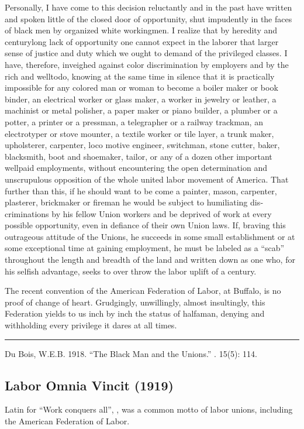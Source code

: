 \documentclass[letterpaper,10pt,english]{jupyterBook}
\begin{document}
\sphinxAtStartPar
Personally, I have come to this decision reluctantly and in the past have written and spoken little of the closed door of opportunity, shut impudently in the faces of black men by organized white workingmen. I realize that by heredity and century\sphinxhyphen{}long lack of opportunity one cannot expect in the laborer that larger sense of justice and duty which we ought to demand of the privileged classes. I have, therefore, inveighed against color discrimination by employers and by the rich and well\sphinxhyphen{}to\sphinxhyphen{}do, knowing at the same time in silence that it is practically impossible for any colored man or woman to become a boiler maker or book binder, an electrical worker or glass maker, a worker in jewelry or leather, a machinist or metal polisher, a paper maker or piano builder, a plumber or a potter, a printer or a pressman, a telegrapher or a railway trackman, an electrotyper or stove mounter, a textile worker or tile layer, a trunk maker, upholsterer, carpenter, loco­ motive engineer, switchman, stone cutter, baker, blacksmith, boot and shoemaker, tailor, or any of a dozen other important well\sphinxhyphen{}paid employments, without encountering the open determination and unscrupulous opposition of the whole united labor movement of America. That further than this, if he should want to be­ come a painter, mason, carpenter, plasterer, brickmaker or fireman he would be subject to humiliating dis­criminations by his fellow Union workers and be deprived of work at every possible opportunity, even in defiance of their own Union laws. If, braving this outrageous attitude of the Unions, he succeeds in some small establishment or at some exceptional time at gaining employment, he must be labeled as a “scab” throughout the length and breadth of the land and written down as one who, for his selfish advantage, seeks to over­ throw the labor uplift of a century.

\sphinxAtStartPar
The recent convention of the American Federation of Labor, at Buffalo, is no proof of change of heart. Grudgingly, unwillingly, almost insultingly, this Federation yields to us inch by inch the status of half\sphinxhyphen{}a\sphinxhyphen{}man, denying and withholding every privilege it dares at all times.


\bigskip\hrule\bigskip


\sphinxAtStartPar
{} Du Bois, W.E.B. 1918. “The Black Man and the Unions.” . 15(5): 114.


\subsection{Labor Omnia Vincit (1919)}
\label{\detokenize{Volumes/18/05/labor_omnia_vincit:labor-omnia-vincit-1919}}\label{\detokenize{Volumes/18/05/labor_omnia_vincit::doc}}
\begin{sphinxShadowBox}
\sphinxstylesidebartitle{}

\sphinxAtStartPar
Latin for “Work conquers all”, , was a common motto of labor unions, including the American Federation of Labor.
\end{sphinxShadowBox}
\end{document}
